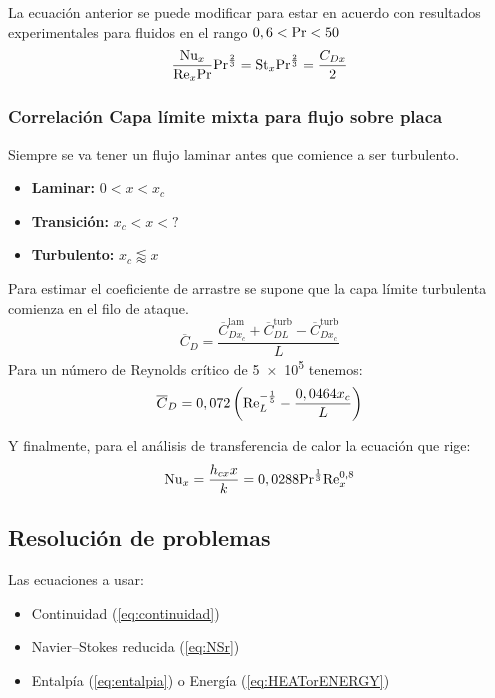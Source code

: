 La ecuación anterior se puede modificar para estar en acuerdo con resultados experimentales para fluidos en el rango $0,6<\textrm{Pr}<50$
\begin{equation}
   \frac{\textrm{Nu}_x}{\textrm{Re}_x \textrm{Pr}}\textrm{Pr}^{\frac{2}{3}}=\textrm{St}_x\textrm{Pr}^{\frac{2}{3}}=\frac{C_{Dx}}{2}
\end{equation}
\subsubsection{Correlación Capa límite mixta para flujo sobre placa}
Siempre se va tener un flujo laminar antes que comience a ser turbulento.
\begin{itemize}
    \item \textbf{Laminar:} $0<x<x_c$
    \item \textbf{Transición:} $x_c<x<?$
    \item \textbf{Turbulento:} $x_c\lessapprox x$
\end{itemize}

Para estimar el coeficiente de arrastre se supone que la capa límite turbulenta comienza en el filo de ataque.
\begin{equation}
    \overline{C}_D=\frac{\overline{C}^{\textrm{lam}}_{Dx_c}+\overline{C}^{\textrm{turb}}_{DL}-\overline{C}^{\textrm{turb}}_{Dx_c}}{L}
\end{equation}
Para un número de Reynolds crítico de \num{5e5} tenemos:
\begin{equation}
    \overline{C}_D=0,072\left( \textrm{Re}_L^{-\frac{1}{5}}-\frac{0,0464x_c}{L}\right)
\end{equation}

Y finalmente, para el análisis de transferencia de calor la ecuación que rige:
\begin{equation} \label{eq:BLNusseltMixed}
        \textrm{Nu}_x=\frac{h_{cx} x}{k}=0,0288 \textrm{Pr}^{\frac{1}{3}} \textrm{Re}_x^{0,8}
\end{equation}

\subsection{Resolución de problemas}
Las ecuaciones a usar:
\begin{itemize}
    \item Continuidad (\ref{eq:continuidad})
    \item Navier--Stokes reducida (\ref{eq:NSr})
    \item Entalpía (\ref{eq:entalpia}) o Energía (\ref{eq:HEATorENERGY})
\end{itemize}


